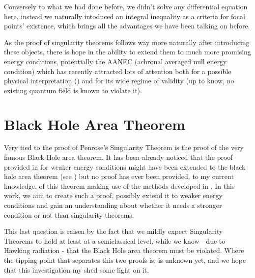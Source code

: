 \documentclass[12pt, a4paper]{article}
\begin{document}
Conversely to what we had done before, we didn't solve any differential equation here, instead we naturally intoduced an integral inequality as a criteria for focal points' existence, which brings all the advantages we have been talking on before.

As the proof of singularity theorems follows way more naturally after introducing these objects, there is hope in the ability to extend them to much more promising energy conditions, potentially the AANEC (achronal averaged null energy condition) which has recently attracted lots of attention both for a possible physical interpretation (\cite{curiel2017primer}) and for its wide regime of validity (up to know, no existing quantum field is known to violate it).

\section{Black Hole Area Theorem}
Very tied to the proof of Penrose's Singularity Theorem is the proof of the very famous Black Hole area theorem.
It has been already noticed that the proof provided in \cite{fewster2011singularity}
for weaker energy conditions might have been extended to the black hole area theorem (see \cite{lesourd2018remark}) but no proof has ever been provided, to my current knowledge, of this theorem making use of the methods developed in \cite{fewster2020new}.
In this work, we aim to create such a proof, possibly extend it to weaker energy conditions and gain an understanding about whether it needs a stronger condition or not than singularity theorems.

This last question is raisen by the fact that we mildly expect Singularity Theorems to hold at least at a semiclassical level, while we know - due to Hawking radiation - that the Black Hole area theorem must be violated. Where the tipping point that separates this two proofs is, is unknown yet, and we hope that this investigation my shed some light on it.



\clearpage

\printbibliography
\end{document}
